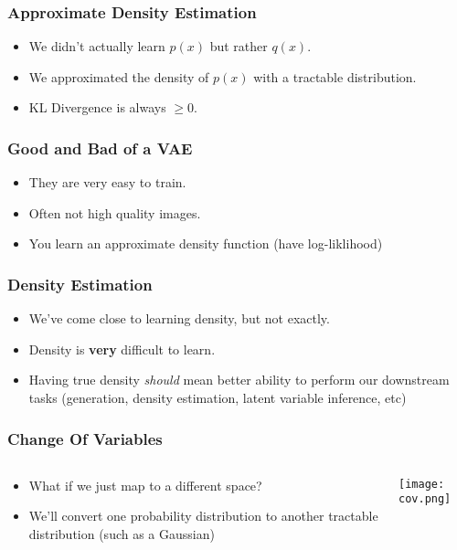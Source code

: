 \begin{frame}
    \frametitle{Approximate Density Estimation}
    \begin{itemize}
        \item We didn't actually learn $p(x)$ but rather $q(x)$.
        \item We approximated the density of $p(x)$ with a tractable
            distribution.
        \item KL Divergence is always $\geq 0$.
    \end{itemize}
\end{frame}

\begin{frame}
    \frametitle{Good and Bad of a VAE}
    \begin{itemize}
        \item They are very easy to train.
        \item Often not high quality images.
        \item You learn an approximate density function (have log-liklihood)
    \end{itemize}
\end{frame}

\begin{frame}
    \frametitle{Density Estimation}
    \begin{itemize}
        \item We've come close to learning density, but not exactly. 
        \item Density is \textbf{very} difficult to learn.
        \item Having true density \textit{should} mean better ability to perform
            our downstream tasks (generation, density estimation, latent
            variable inference, etc)
    \end{itemize}
\end{frame}

\begin{frame}
    \frametitle{Change Of Variables}
    \begin{columns}
        \begin{column}{0.49\paperwidth}
            \begin{itemize}
                \item What if we just map to a different space?
                \item We'll convert one probability distribution to another
                    tractable distribution (such as a Gaussian)
            \end{itemize}
        \end{column}
        \begin{column}{0.49\paperwidth}
            \center\texttt{[image: cov.png]}
        \end{column}
    \end{columns}
\end{frame}

